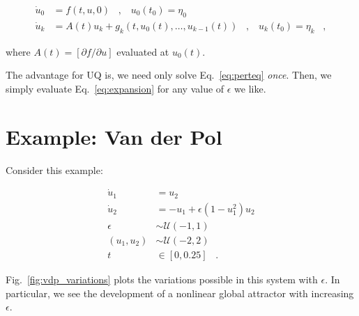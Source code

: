 \documentclass[11pt]{article}
\begin{document}
\begin{equation}
        \label{eq:perteq}
        \begin{aligned}
                \dot{u}_0 &= f( t , u , 0 ) \;\;\; , \;\;\; u_0(t_0) = \eta_0 \\
                \dot{u}_k &= A(t) u_k + g_k( t , u_0(t) , \dots , u_{k-1}(t) ) \;\;\; , \;\;\; u_k(t_0) = \eta_k  \;\;\; ,
        \end{aligned}
\end{equation}

\noindent where $A(t) = [ \partial f / \partial u ]$ evaluated at $u_0(t)$.

\noindent The advantage for UQ is, we need only solve Eq.~\ref{eq:perteq} {\it once}. 
Then, we simply evaluate Eq.~\ref{eq:expansion} for any value of $\epsilon$ we like.

\section{Example: Van der Pol}

Consider this example:

\begin{equation}
        \label{eq:vdp}
        \begin{aligned}
                \dot{u}_1 &= u_2 \\
                \dot{u}_2 &= -u_1 + \epsilon ( 1 - u_1^2 ) u_2 \\
                \epsilon &\sim \mathcal{U}(-1,1) \\
                (u_1,u_2) &\sim \mathcal{U}(-2,2) \\
                t &\in [0,0.25] \;\;\; .
        \end{aligned}
\end{equation}

\noindent Fig.~\ref{fig:vdp_variations} plots the variations possible in this system with $\epsilon$.
In particular, we see the development of a nonlinear global attractor with increasing $\epsilon$.
\end{document}

